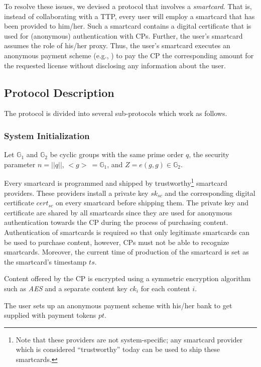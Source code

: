 \documentclass{llncs}
\begin{document}
To resolve these issues, we devised a protocol that involves a \emph{smartcard}. That is, instead of collaborating with a TTP, every user will employ a smartcard that has been provided to him/her. Such a smartcard contains a digital certificate that is used for (anonymous) authentication with CPs. Further, the user's smartcard assumes the role of his/her proxy. Thus, the user's smartcard executes an anonymous payment scheme (e.g., \cite{Tewari1998}) to pay the CP the corresponding amount for the requested license without disclosing any information about the user.


\subsection{Protocol Description}

The protocol is divided into several sub-protocols which work as follows.

\subsubsection{System Initialization} \label{system_initialization}

Let $\mathbb G_{1}$ and $\mathbb G_{2}$ be cyclic groups with the same prime order $q$, the security parameter $n = ||q||$, ${<}g{>}\ = \mathbb G_{1}$, and $Z = e(g,g) \in \mathbb G_{2}$. 


Every smartcard is programmed and shipped by trustworthy\footnote{Note that these providers are not system-specific; any smartcard provider which is considered ``trustworthy'' today can be used to ship these smartcards.} smartcard providers. These providers install a private key $sk_{sc}$ and the corresponding digital certificate $cert_{sc}$ on every smartcard before shipping them. The private key and certificate are shared by all smartcards since they are used for anonymous authentication towards the CP during the process of purchasing content. Authentication of smartcards is required so that only legitimate smartcards can be used to purchase content, however, CPs must not be able to recognize smartcards. Moreover, the current time of production of the smartcard is set as the smartcard's timestamp $ts$.


Content offered by the CP is encrypted using a symmetric encryption algorithm such as \emph{AES} \cite{aes} and a separate content key $ck_{i}$ for each content $i$. 

The user sets up an anonymous payment scheme with his/her bank to get supplied with payment tokens $pt$.
\end{document}
